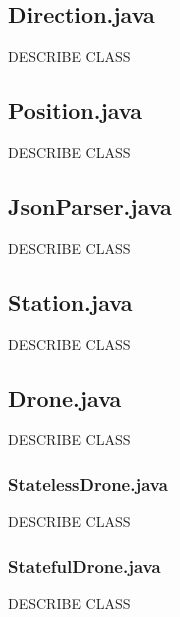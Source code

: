\documentclass{article}
\begin{document}
\subsection{Direction.java}
\label{Direction.java}
\begin{description}
DESCRIBE CLASS
\end{description} 

\subsection{Position.java}
\label{Position.java}
\begin{description}
DESCRIBE CLASS
\end{description} 

\subsection{JsonParser.java}
\label{JsonParser.java}
\begin{description}
DESCRIBE CLASS
\end{description} 

\subsection{Station.java}
\label{Station.java}
\begin{description}
DESCRIBE CLASS
\end{description} 

\subsection{Drone.java}
\label{Drone.java}
\begin{description}
DESCRIBE CLASS
\end{description} 

\subsubsection{StatelessDrone.java}
\label{StatelessDrone.java}
\begin{description}
DESCRIBE CLASS
\end{description} 

\subsubsection{StatefulDrone.java}
\label{StatefulDrone.java}
\begin{description}
DESCRIBE CLASS
\end{description} 
\pagebreak
\end{document}
